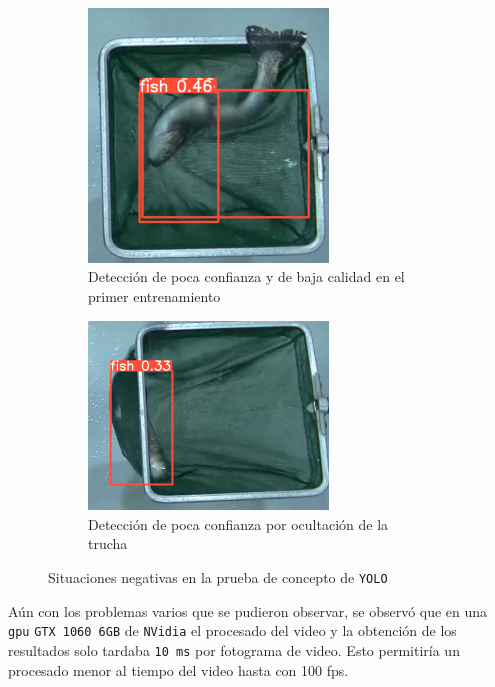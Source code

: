 \begin{figure}[H]
    \centering
    \begin{subfigure}[b]{0.4\textwidth}
        \centering
        \includegraphics[width=0.7\textwidth]{images/6/6.2.2/DeteccionRaraTrain1.png}
        \caption{Detección de poca confianza y de baja calidad en el primer entrenamiento}
    \end{subfigure}
    \begin{subfigure}[b]{0.5\textwidth}
        \centering
        \includegraphics[width=0.7\textwidth]{images/6/6.2.2/PocaConfianzaTrain1.png}
        \caption{Detección de poca confianza por ocultación de la trucha}
    \end{subfigure}
    \caption{Situaciones negativas en la prueba de concepto de \texttt{YOLO}}
    \label{fig:YOLOTrain1Mal}
\end{figure}

Aún con los problemas varios que se pudieron observar, se observó que en una \texttt{\acrshort{gpu}} \texttt{GTX 1060 6GB} de \texttt{NVidia} el procesado del video y la obtención de los resultados solo tardaba \texttt{10 ms} 
por fotograma de video. Esto permitiría un procesado menor al tiempo del video hasta con 100 \acrshort{fps}.

